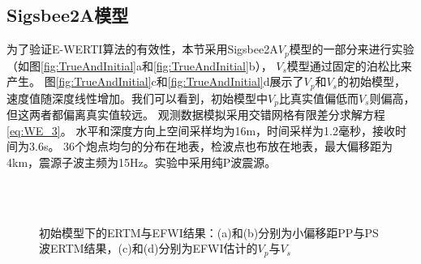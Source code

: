 \subsection{Sigsbee2A模型}
为了验证E-WERTI算法的有效性，本节采用Sigsbee2A$V_p$模型的一部分来进行实验（如图\ref{fig:TrueAndInitial}a和\ref{fig:TrueAndInitial}b），
$V_s$模型通过固定的泊松比来产生。
图\ref{fig:TrueAndInitial}c和\ref{fig:TrueAndInitial}d展示了$V_p$和$V_s$的初始模型，
速度值随深度线性增加。我们可以看到，初始模型中$V_p$比真实值偏低而$V_s$则偏高，
但这两者都偏离真实值较远。
观测数据模拟采用交错网格有限差分求解方程\eqref{eq:WE_3}。
水平和深度方向上空间采样均为16m，时间采样为1.2毫秒，接收时间为3.6s。
36个炮点均匀的分布在地表，检波点也布放在地表，最大偏移距为4km，震源子波主频为15Hz。实验中采用纯P波震源。

\begin{figure}[!htb]
   \centering
   \\
   \\
   \caption{初始模型下的ERTM与EFWI结果：(a)和(b)分别为小偏移距PP与PS波ERTM结果，(c)和(d)分别为EFWI估计的$V_p$与$V_s$}
   \label{fig:Results_init}
\end{figure}
